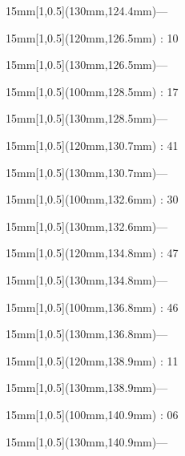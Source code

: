 \documentclass[a4paper]{memoir}
\begin{document}
\begin{textblock*}{15mm}[1,0.5](130mm,124.4mm)\flushright —\end{textblock*}
\begin{textblock*}{15mm}[1,0.5](120mm,126.5mm) : 10\end{textblock*}
\begin{textblock*}{15mm}[1,0.5](130mm,126.5mm)\flushright —\end{textblock*}
\begin{textblock*}{15mm}[1,0.5](100mm,128.5mm) : 17\end{textblock*}
\begin{textblock*}{15mm}[1,0.5](130mm,128.5mm)\flushright —\end{textblock*}
\begin{textblock*}{15mm}[1,0.5](120mm,130.7mm) : 41\end{textblock*}
\begin{textblock*}{15mm}[1,0.5](130mm,130.7mm)\flushright —\end{textblock*}
\begin{textblock*}{15mm}[1,0.5](100mm,132.6mm) : 30\end{textblock*}
\begin{textblock*}{15mm}[1,0.5](130mm,132.6mm)\flushright —\end{textblock*}
\begin{textblock*}{15mm}[1,0.5](120mm,134.8mm) : 47\end{textblock*}
\begin{textblock*}{15mm}[1,0.5](130mm,134.8mm)\flushright —\end{textblock*}
\begin{textblock*}{15mm}[1,0.5](100mm,136.8mm) : 46\end{textblock*}
\begin{textblock*}{15mm}[1,0.5](130mm,136.8mm)\flushright —\end{textblock*}
\begin{textblock*}{15mm}[1,0.5](120mm,138.9mm) : 11\end{textblock*}
\begin{textblock*}{15mm}[1,0.5](130mm,138.9mm)\flushright —\end{textblock*}
\begin{textblock*}{15mm}[1,0.5](100mm,140.9mm) : 06\end{textblock*}
\begin{textblock*}{15mm}[1,0.5](130mm,140.9mm)\flushright —\end{textblock*}
\end{document}
